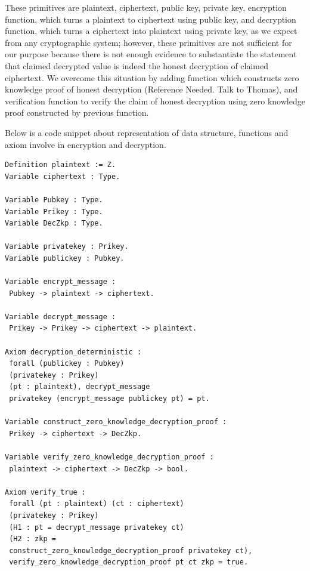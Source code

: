 \documentclass{llncs}
\begin{document}
These primitives are plaintext, ciphertext, public key, private key, 
encryption function, which turns a plaintext to ciphertext using 
public key, and decryption function, which turns a ciphertext into 
plaintext using private key, as we expect from any cryptographic system; 
however, these primitives are not sufficient for our purpose because there is 
not enough evidence to substantiate the statement that  
claimed decrypted value is indeed the 
honest decryption of claimed ciphertext. We overcome this situation 
by adding function which constructs zero knowledge proof of honest 
decryption (Reference Needed. Talk to Thomas), and verification 
function to verify the claim of honest decryption using zero 
knowledge proof constructed by previous function. 





Below is a code snippet about representation
of data structure, functions and axiom involve in encryption and decryption.


\begin{lstlisting}[frame=single,basicstyle=\ttfamily\footnotesize]
Definition plaintext := Z.
Variable ciphertext : Type. 

Variable Pubkey : Type.
Variable Prikey : Type.
Variable DecZkp : Type.

Variable privatekey : Prikey.
Variable publickey : Pubkey.

Variable encrypt_message :
 Pubkey -> plaintext -> ciphertext.

Variable decrypt_message :
 Prikey -> Prikey -> ciphertext -> plaintext.

Axiom decryption_deterministic :
 forall (publickey : Pubkey) 
 (privatekey : Prikey) 
 (pt : plaintext), decrypt_message 
 privatekey (encrypt_message publickey pt) = pt.
 
Variable construct_zero_knowledge_decryption_proof :
 Prikey -> ciphertext -> DecZkp.

Variable verify_zero_knowledge_decryption_proof :
 plaintext -> ciphertext -> DecZkp -> bool.

Axiom verify_true :
 forall (pt : plaintext) (ct : ciphertext) 
 (privatekey : Prikey)
 (H1 : pt = decrypt_message privatekey ct)
 (H2 : zkp = 
 construct_zero_knowledge_decryption_proof privatekey ct),
 verify_zero_knowledge_decryption_proof pt ct zkp = true.
\end{lstlisting}
\end{document}
